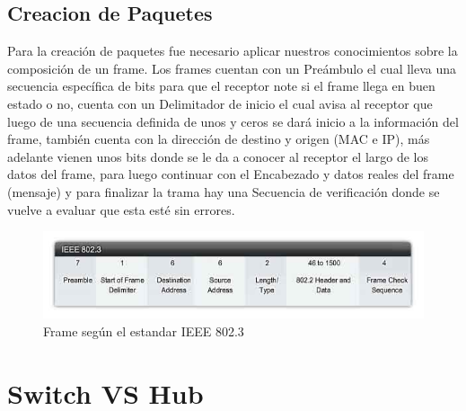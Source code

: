 \documentclass{udpreport}
\begin{document}
	\section{Creacion de Paquetes}
		Para la creación de paquetes fue necesario aplicar nuestros conocimientos sobre la composición de un frame.
		Los frames cuentan con un Preámbulo el cual lleva una secuencia específica de bits para que el receptor note si el
		frame llega en buen estado o no, cuenta con un Delimitador de inicio el cual avisa al receptor que luego de una
		secuencia definida de unos y ceros se dará inicio a la información del frame, también cuenta con la dirección de
		destino y origen (MAC e IP), más adelante vienen unos bits donde se le da a conocer al receptor el largo de los datos
		del frame, para luego continuar con el Encabezado y datos reales del frame (mensaje) y para finalizar la trama hay una
		Secuencia de verificación donde se vuelve a evaluar que esta esté sin errores.\\
		\begin{figure}[H]
		    \centering
		    \includegraphics[width=\textwidth]{frame.jpg}
		    \caption{Frame según el estandar IEEE 802.3}
		\end{figure}
\chapter{Switch VS Hub}
\end{document}
